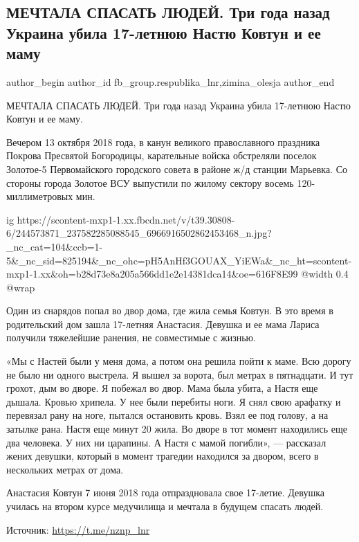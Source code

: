  
 
 
 
 
 
\subsection{МЕЧТАЛА СПАСАТЬ ЛЮДЕЙ. Три года назад Украина убила 17-летнюю Настю Ковтун и ее маму}
\label{sec:13_10_2021.fb.fb_group.respublika_lnr.1.kovtun_nastia_murder}
 
\ifcmt
 author_begin
   author_id fb_group.respublika_lnr,zimina_olesja
 author_end
\fi

МЕЧТАЛА СПАСАТЬ ЛЮДЕЙ. Три года назад Украина убила 17-летнюю Настю Ковтун и ее
маму.

Вечером 13 октября 2018 года, в канун великого православного праздника Покрова
Пресвятой Богородицы, карательные войска обстреляли поселок Золотое-5
Первомайского городского совета в районе ж/д станции Марьевка. Со стороны
города Золотое ВСУ выпустили по жилому сектору восемь 120-миллиметровых мин. 

\ifcmt
  ig https://scontent-mxp1-1.xx.fbcdn.net/v/t39.30808-6/244573871_237582285088545_6966916502862453468_n.jpg?_nc_cat=104&ccb=1-5&_nc_sid=825194&_nc_ohc=pH5AnHf3GOUAX_YiEWa&_nc_ht=scontent-mxp1-1.xx&oh=b28d73e8a205a566dd1e2e14381dca14&oe=616F8E99
  @width 0.4
  @wrap 
\fi

Один из снарядов попал во двор дома, где жила семья Ковтун. В это время в
родительский дом зашла 17-летняя Анастасия. Девушка и ее мама Лариса получили
тяжелейшие ранения, не совместимые с жизнью. 

«Мы с Настей были у меня дома, а потом она решила пойти к маме. Всю дорогу не
было ни одного выстрела. Я вышел за ворота, был метрах в пятнадцати. И тут
грохот, дым во дворе. Я побежал во двор. Мама была убита, а Настя еще дышала.
Кровью хрипела. У нее были перебиты ноги. Я снял свою арафатку и перевязал рану
на ноге, пытался остановить кровь. Взял ее под голову, а на затылке рана. Настя
еще минут 20 жила. Во дворе в тот момент находились еще два человека. У них ни
царапины. А Настя с мамой погибли», — рассказал жених девушки, который в момент
трагедии находился за двором, всего в нескольких метрах от дома.

Анастасия Ковтун 7 июня 2018 года отпраздновала свое 17-летие. Девушка училась
на втором курсе медучилища и мечтала в будущем спасать людей.

Источник:  \url{https://t.me/nznp_lnr}

